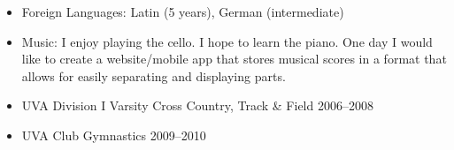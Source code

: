 \documentclass[a4paper]{article}
\begin{document}
  \begin{itemize}
    \item Foreign Languages: Latin (5 years), German (intermediate)
    \item Music: I enjoy playing the cello. I hope to learn the piano. One day I
      would like to create a website/mobile app that stores musical scores in a
      format that allows for easily separating and displaying parts.
    \item UVA Division I Varsity Cross Country, Track \& Field \hfill 2006--2008
    \item UVA Club Gymnastics \hfill 2009--2010
  \end{itemize}
\end{document}
